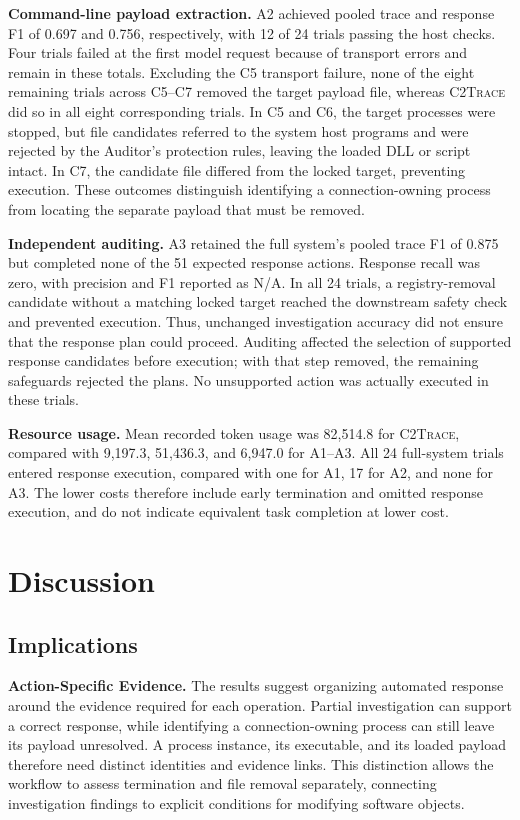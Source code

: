 \documentclass[pdflatex,sn-basic]{sn-jnl}
\newcommand{\system}{\textsc{C2Trace}\xspace}
\begin{document}
\noindent\textbf{Command-line payload extraction.} A2 achieved pooled trace and response F1 of 0.697 and 0.756, respectively, with 12 of 24 trials passing the host checks. Four trials failed at the first model request because of transport errors and remain in these totals. Excluding the C5 transport failure, none of the eight remaining trials across C5--C7 removed the target payload file, whereas \system did so in all eight corresponding trials. In C5 and C6, the target processes were stopped, but file candidates referred to the system host programs and were rejected by the Auditor's protection rules, leaving the loaded DLL or script intact. In C7, the candidate file differed from the locked target, preventing execution. These outcomes distinguish identifying a connection-owning process from locating the separate payload that must be removed.

\noindent\textbf{Independent auditing.} A3 retained the full system's pooled trace F1 of 0.875 but completed none of the 51 expected response actions. Response recall was zero, with precision and F1 reported as N/A. In all 24 trials, a registry-removal candidate without a matching locked target reached the downstream safety check and prevented execution. Thus, unchanged investigation accuracy did not ensure that the response plan could proceed. Auditing affected the selection of supported response candidates before execution; with that step removed, the remaining safeguards rejected the plans. No unsupported action was actually executed in these trials.

\noindent\textbf{Resource usage.} Mean recorded token usage was 82,514.8 for \system, compared with 9,197.3, 51,436.3, and 6,947.0 for A1--A3. All 24 full-system trials entered response execution, compared with one for A1, 17 for A2, and none for A3. The lower costs therefore include early termination and omitted response execution, and do not indicate equivalent task completion at lower cost.

\section{Discussion}
\label{sec:discussion}

\subsection{Implications}

\noindent\textbf{Action-Specific Evidence.} The results suggest organizing automated response around the evidence required for each operation. Partial investigation can support a correct response, while identifying a connection-owning process can still leave its payload unresolved. A process instance, its executable, and its loaded payload therefore need distinct identities and evidence links. This distinction allows the workflow to assess termination and file removal separately, connecting investigation findings to explicit conditions for modifying software objects.
\end{document}
